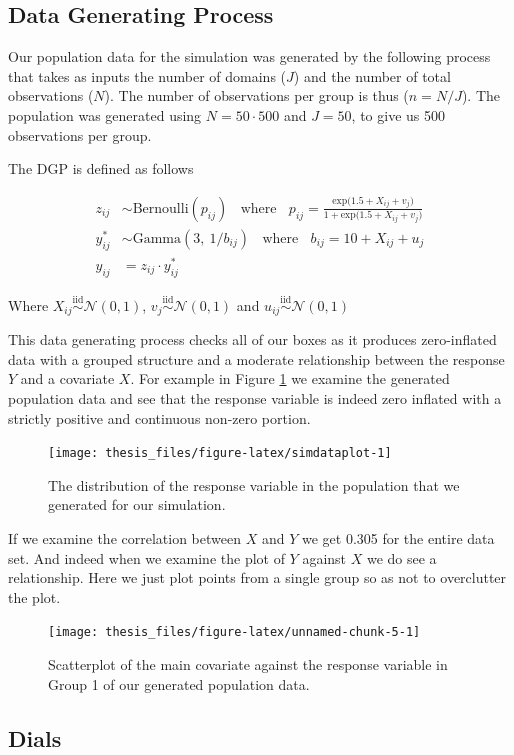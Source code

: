 \documentclass[12pt,twoside]{reedthesis}
\begin{document}
\hypertarget{data-generating-process}{%
\subsection{Data Generating Process}\label{data-generating-process}}

Our population data for the simulation was generated by the following process that takes as inputs the number of domains (\(J\)) and the number of total observations (\(N\)). The number of observations per group is thus (\(n = N/J\)). The population was generated using \(N = 50\cdot 500\) and \(J = 50\), to give us 500 observations per group.

The DGP is defined as follows

\[
\begin{aligned}
z_{ij} &\sim \text{Bernoulli}(p_{ij}) \ \ \ \ \text{where} \ \ \ \ p_{ij} = \frac{\text{exp}\big(1.5 + X_{ij} + v_j\big)}{1 + \text{exp}\big(1.5 + X_{ij} + v_j\big)} \\
y^*_{ij} &\sim \text{Gamma}(3, \  1/b_{ij}) \ \ \ \ \text{where} \ \ \ \ b_{ij} = 10 + X_{ij} + u_{j} \\
y_{ij} &=z_{ij}\cdot y^*_{ij}
\end{aligned}
\]

Where \(X_{ij} \overset{\text{iid}}{\sim} \mathcal{N}(0, 1)\), \(v_j \overset{\text{iid}}{\sim} \mathcal{N}(0, 1)\) and \(u_{ij} \overset{\text{iid}}{\sim} \mathcal{N}(0, 1)\)

This data generating process checks all of our boxes as it produces zero-inflated data with a grouped structure and a moderate relationship between the response \(Y\) and a covariate \(X\). For example in Figure \ref{fig:simdataplot} we examine the generated population data and see that the response variable is indeed zero inflated with a strictly positive and continuous non-zero portion.
\begin{figure}

{\centering \texttt{[image: thesis\_files/figure-latex/simdataplot-1]} 

}

\caption{The distribution of the response variable in the population that we generated for our simulation.}\label{fig:simdataplot}
\end{figure}
If we examine the correlation between \(X\) and \(Y\) we get 0.305 for the entire data set. And indeed when we examine the plot of \(Y\) against \(X\) we do see a relationship. Here we just plot points from a single group so as not to overclutter the plot.
\begin{figure}

{\centering \texttt{[image: thesis\_files/figure-latex/unnamed-chunk-5-1]} 

}

\caption{Scatterplot of the main covariate against the response variable in Group 1 of our generated population data.}\label{fig:unnamed-chunk-5}
\end{figure}
\hypertarget{dials}{%
\subsection{Dials}\label{dials}}
\end{document}
